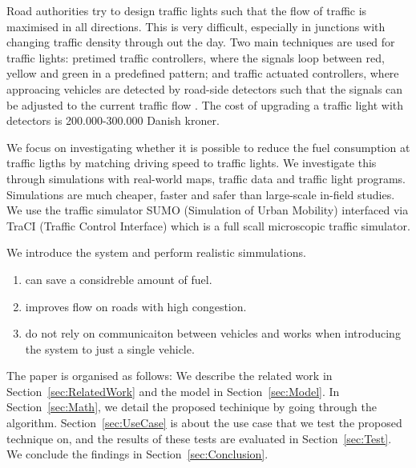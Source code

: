 Road authorities try to design traffic lights such that the flow of traffic is maximised in all directions.
This is very difficult, especially in junctions with changing traffic density through out the day.
Two main techniques are used for traffic lights: pretimed traffic controllers, where the signals loop between red, yellow and green in a predefined pattern; and traffic actuated controllers, where approacing vehicles are detected by road-side detectors such that the signals can be adjusted to the current traffic flow \cite{Vejdir}.
The cost of upgrading a traffic light with detectors is 200.000-300.000 Danish kroner\cite{Vejdir}.

We focus on investigating whether it is possible to reduce the fuel consumption at traffic ligths by matching driving speed to traffic lights. 
We investigate this through simulations with real-world maps, traffic data and traffic light programs. %
Simulations are much cheaper, faster and safer than large-scale in-field studies. %
We use the traffic simulator SUMO (Simulation of Urban Mobility)\cite{sumo} interfaced via TraCI (Traffic Control Interface)\cite{traci} which is a full scall microscopic traffic simulator.

We introduce the system \tech and perform realistic simmulations.
\begin{enumerate}
	\item \tech can save a considreble amount of fuel.
	\item \tech improves flow on roads with high congestion.
	\item \tech do not rely on communicaiton between vehicles and works when introducing the system to just a single vehicle.

\end{enumerate}
The paper is organised as follows: 
We describe the related work in Section~\ref{sec:RelatedWork} and the model in Section~\ref{sec:Model}. 
In Section~\ref{sec:Math}, we detail the proposed techinique by going through the algorithm.
Section~\ref{sec:UseCase} is about the use case that we test the proposed technique on, and the results of these tests are evaluated in Section~\ref{sec:Test}. 
We conclude the findings in Section~\ref{sec:Conclusion}.





